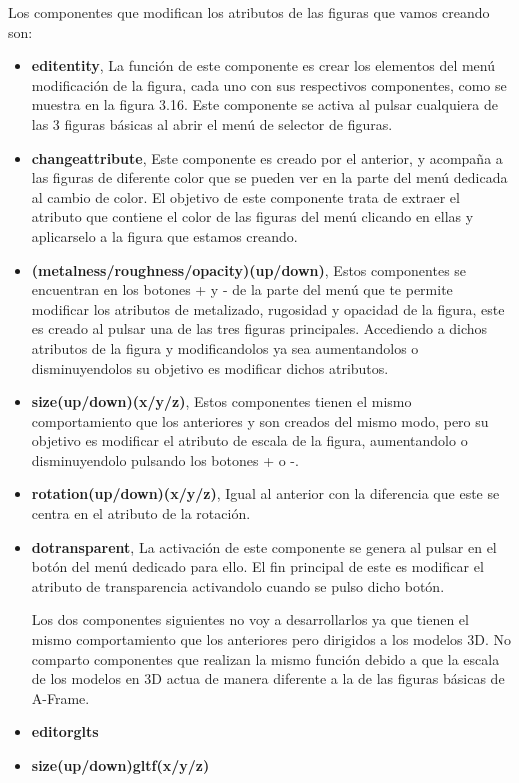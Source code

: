 \documentclass[a4paper, 12pt]{book}
\begin{document}
Los componentes que modifican los atributos de las figuras que vamos creando son:
\begin{itemize}
    \item \textbf{editentity}, La función de este componente es crear los elementos del menú modificación de la figura, cada uno con sus respectivos componentes, como se muestra en la figura 3.16. Este componente se activa al pulsar cualquiera de las 3 figuras básicas al abrir el menú de selector de figuras. 
    
    \item \textbf{changeattribute}, Este componente es creado por el anterior, y acompaña a las figuras de diferente color que se pueden ver en la parte del menú dedicada al cambio de color. El objetivo de este componente trata de extraer el atributo que contiene el color de las figuras del menú clicando en ellas y aplicarselo a la figura que estamos creando. 
    
    \item \textbf{(metalness/roughness/opacity)(up/down)}, Estos componentes se encuentran en los botones + y - de la parte del menú que te permite modificar los atributos de metalizado, rugosidad y opacidad de la figura, este es creado al pulsar una de las tres figuras principales. Accediendo a dichos atributos de la figura y modificandolos ya sea aumentandolos o disminuyendolos su objetivo es modificar dichos atributos.
    
    \item \textbf{size(up/down)(x/y/z)}, Estos componentes tienen el mismo comportamiento que los anteriores y son creados del mismo modo, pero su objetivo es modificar el atributo de escala de la figura, aumentandolo o disminuyendolo pulsando los botones + o -.
    
    \item \textbf{rotation(up/down)(x/y/z)}, Igual al anterior con la diferencia que este se centra en el atributo de la rotación.
    
    \item \textbf{dotransparent}, La activación de este componente se genera al pulsar en el botón del menú dedicado para ello. El fin principal de este es modificar el atributo de transparencia  activandolo cuando se pulso dicho botón.
    
    Los dos componentes siguientes no voy a desarrollarlos ya que tienen el mismo comportamiento que los anteriores pero dirigidos a los modelos 3D. No comparto componentes que realizan la mismo función debido a que la escala de los modelos en 3D actua de manera diferente a la de las figuras básicas de A-Frame.
    \item \textbf{editorglts}
    \item \textbf{size(up/down)gltf(x/y/z)}
\end{itemize}
\end{document}
